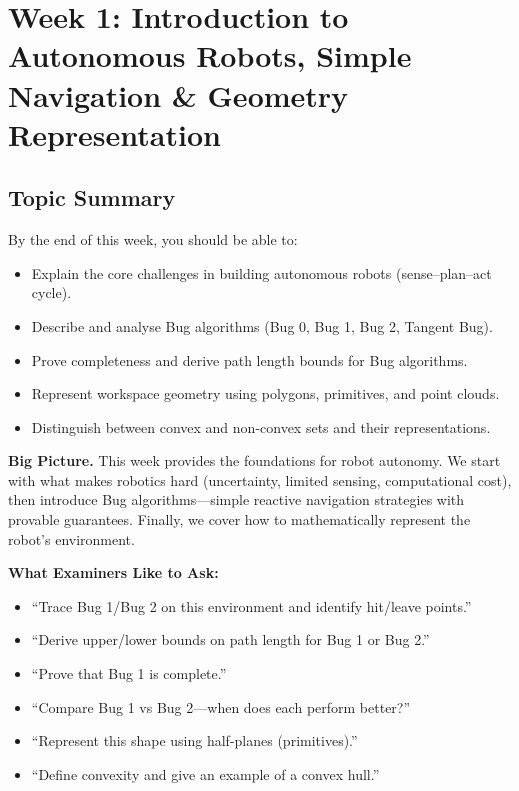 \section{Week 1: Introduction to Autonomous Robots, Simple Navigation \& Geometry Representation}

\subsection{Topic Summary}

\begin{keybox}
By the end of this week, you should be able to:
\begin{itemize}
  \item Explain the core challenges in building autonomous robots (sense--plan--act cycle).
  \item Describe and analyse Bug algorithms (Bug 0, Bug 1, Bug 2, Tangent Bug).
  \item Prove completeness and derive path length bounds for Bug algorithms.
  \item Represent workspace geometry using polygons, primitives, and point clouds.
  \item Distinguish between convex and non-convex sets and their representations.
\end{itemize}
\end{keybox}

\textbf{Big Picture.} This week provides the foundations for robot autonomy. We start with what makes robotics hard (uncertainty, limited sensing, computational cost), then introduce Bug algorithms---simple reactive navigation strategies with provable guarantees. Finally, we cover how to mathematically represent the robot's environment.

\textbf{What Examiners Like to Ask:}
\begin{itemize}
  \item ``Trace Bug 1/Bug 2 on this environment and identify hit/leave points.''
  \item ``Derive upper/lower bounds on path length for Bug 1 or Bug 2.''
  \item ``Prove that Bug 1 is complete.''
  \item ``Compare Bug 1 vs Bug 2---when does each perform better?''
  \item ``Represent this shape using half-planes (primitives).''
  \item ``Define convexity and give an example of a convex hull.''
\end{itemize}

